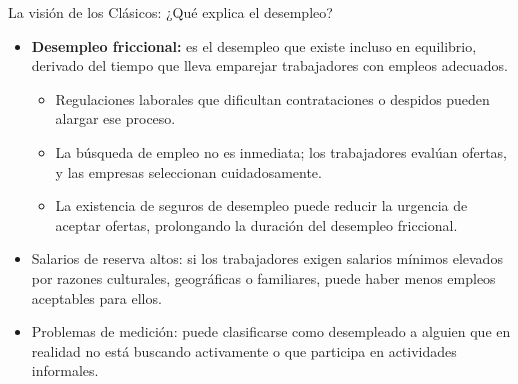 \documentclass{beamer}
\begin{document}
\begin{frame}{La visión de los Clásicos:  ¿Qué explica el desempleo?}
        \begin{itemize}
          \item \textbf{Desempleo friccional:} es el desempleo que existe incluso en equilibrio, derivado del tiempo que lleva emparejar trabajadores con empleos adecuados.
                \begin{itemize}
                \item Regulaciones laborales que dificultan contrataciones o despidos pueden alargar ese proceso.
                \item La búsqueda de empleo no es inmediata; los trabajadores evalúan ofertas, y las empresas seleccionan cuidadosamente.
                \item La existencia de seguros de desempleo puede reducir la urgencia de aceptar ofertas, prolongando la duración del desempleo friccional.
                \end{itemize}
            \item Salarios de reserva altos: si los trabajadores exigen salarios mínimos elevados por razones culturales, geográficas o familiares, puede haber menos empleos aceptables para ellos.
            \item Problemas de medición: puede clasificarse como desempleado a alguien que en realidad no está buscando activamente o que participa en actividades informales.
        \end{itemize}
\end{frame}
\end{document}
